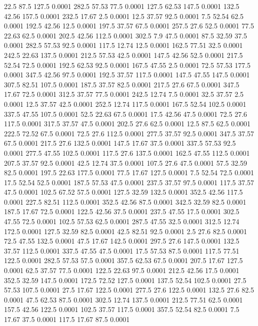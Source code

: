 22.5	87.5	127.5	0.0001
282.5	57.53	77.5	0.0001
127.5	62.53	147.5	0.0001
132.5	42.56	157.5	0.0001
232.5	17.67	2.5	0.0001
12.5	37.57	92.5	0.0001
7.5	52.54	62.5	0.0001
192.5	42.56	12.5	0.0001
197.5	37.57	67.5	0.0001
257.5	27.6	52.5	0.0001
77.5	22.63	62.5	0.0001
202.5	42.56	112.5	0.0001
302.5	7.9	47.5	0.0001
87.5	32.59	37.5	0.0001
282.5	57.53	92.5	0.0001
117.5	12.74	12.5	0.0001
162.5	77.51	32.5	0.0001
242.5	22.63	137.5	0.0001
212.5	57.53	42.5	0.0001
147.5	42.56	52.5	0.0001
217.5	52.54	72.5	0.0001
192.5	62.53	92.5	0.0001
167.5	47.55	2.5	0.0001
72.5	57.53	177.5	0.0001
347.5	42.56	97.5	0.0001
192.5	37.57	117.5	0.0001
147.5	47.55	147.5	0.0001
307.5	82.51	107.5	0.0001
187.5	37.57	82.5	0.0001
217.5	27.6	67.5	0.0001
347.5	17.67	72.5	0.0001
312.5	37.57	77.5	0.0001
242.5	12.74	7.5	0.0001
32.5	37.57	2.5	0.0001
12.5	37.57	42.5	0.0001
252.5	12.74	117.5	0.0001
167.5	52.54	102.5	0.0001
337.5	47.55	107.5	0.0001
52.5	22.63	67.5	0.0001
17.5	42.56	47.5	0.0001
72.5	27.6	117.5	0.0001
317.5	37.57	47.5	0.0001
202.5	27.6	62.5	0.0001
12.5	87.5	62.5	0.0001
222.5	72.52	67.5	0.0001
72.5	27.6	112.5	0.0001
277.5	37.57	92.5	0.0001
347.5	37.57	67.5	0.0001
217.5	27.6	132.5	0.0001
147.5	17.67	37.5	0.0001
337.5	57.53	92.5	0.0001
277.5	47.55	102.5	0.0001
117.5	27.6	137.5	0.0001
162.5	47.55	112.5	0.0001
207.5	37.57	92.5	0.0001
42.5	12.74	37.5	0.0001
107.5	27.6	47.5	0.0001
57.5	32.59	82.5	0.0001
197.5	22.63	177.5	0.0001
77.5	17.67	127.5	0.0001
7.5	52.54	72.5	0.0001
17.5	52.54	52.5	0.0001
187.5	57.53	47.5	0.0001
237.5	37.57	97.5	0.0001
117.5	37.57	47.5	0.0001
102.5	67.52	57.5	0.0001
127.5	32.59	132.5	0.0001
352.5	42.56	117.5	0.0001
227.5	82.51	112.5	0.0001
352.5	42.56	87.5	0.0001
342.5	32.59	82.5	0.0001
187.5	17.67	72.5	0.0001
122.5	42.56	37.5	0.0001
237.5	47.55	17.5	0.0001
302.5	47.55	72.5	0.0001
102.5	57.53	62.5	0.0001
287.5	47.55	32.5	0.0001
312.5	12.74	172.5	0.0001
127.5	32.59	82.5	0.0001
42.5	82.51	92.5	0.0001
2.5	27.6	82.5	0.0001
72.5	47.55	132.5	0.0001
47.5	17.67	142.5	0.0001
297.5	27.6	147.5	0.0001
132.5	37.57	112.5	0.0001
337.5	47.55	47.5	0.0001
17.5	57.53	87.5	0.0001
117.5	77.51	122.5	0.0001
282.5	57.53	57.5	0.0001
357.5	62.53	67.5	0.0001
207.5	17.67	127.5	0.0001
62.5	37.57	77.5	0.0001
122.5	22.63	97.5	0.0001
212.5	42.56	17.5	0.0001
352.5	32.59	147.5	0.0001
172.5	72.52	127.5	0.0001
137.5	52.54	102.5	0.0001
27.5	57.53	107.5	0.0001
27.5	17.67	122.5	0.0001
277.5	27.6	122.5	0.0001
132.5	27.6	82.5	0.0001
47.5	62.53	87.5	0.0001
302.5	12.74	137.5	0.0001
212.5	77.51	62.5	0.0001
157.5	42.56	122.5	0.0001
102.5	37.57	117.5	0.0001
357.5	52.54	82.5	0.0001
7.5	17.67	37.5	0.0001
117.5	17.67	87.5	0.0001
